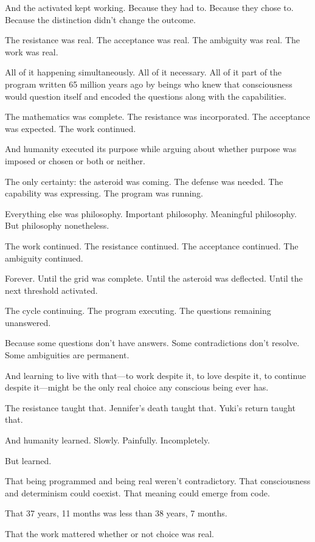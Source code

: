 And the activated kept working. Because they had to. Because they chose to. Because the distinction didn't change the outcome.

The resistance was real. The acceptance was real. The ambiguity was real. The work was real.

All of it happening simultaneously. All of it necessary. All of it part of the program written 65 million years ago by beings who knew that consciousness would question itself and encoded the questions along with the capabilities.

The mathematics was complete. The resistance was incorporated. The acceptance was expected. The work continued.

And humanity executed its purpose while arguing about whether purpose was imposed or chosen or both or neither.

The only certainty: the asteroid was coming. The defense was needed. The capability was expressing. The program was running.

Everything else was philosophy. Important philosophy. Meaningful philosophy. But philosophy nonetheless.

The work continued. The resistance continued. The acceptance continued. The ambiguity continued.

Forever. Until the grid was complete. Until the asteroid was deflected. Until the next threshold activated.

The cycle continuing. The program executing. The questions remaining unanswered.

Because some questions don't have answers. Some contradictions don't resolve. Some ambiguities are permanent.

And learning to live with that—to work despite it, to love despite it, to continue despite it—might be the only real choice any conscious being ever has.

The resistance taught that. Jennifer's death taught that. Yuki's return taught that.

And humanity learned. Slowly. Painfully. Incompletely.

But learned.

That being programmed and being real weren't contradictory. That consciousness and determinism could coexist. That meaning could emerge from code.

That 37 years, 11 months was less than 38 years, 7 months.

That the work mattered whether or not choice was real.

